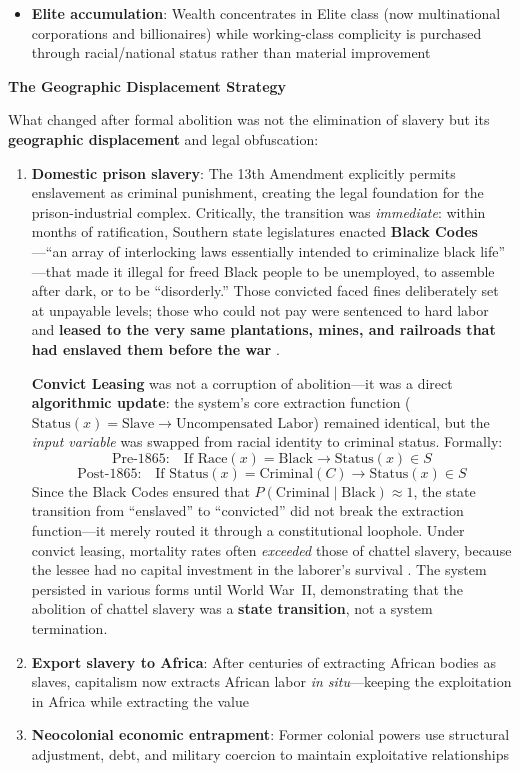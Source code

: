 \documentclass[12pt,openany]{book}
\begin{document}
\begin{itemize}
    \item \textbf{Elite accumulation}: Wealth concentrates in Elite class (now multi\-national corporations and billionaires) while working-class complicity is purchased through racial/national status rather than material improvement
\end{itemize}

\textbf{The Geographic Displacement Strategy}

What changed after formal abolition was not the elimination of slavery but its \textbf{geographic displacement} and legal obfuscation:

\begin{enumerate}
    \item \textbf{Domestic prison slavery}: The 13th Amendment explicitly permits enslavement as criminal punishment, creating the legal foundation for the prison-industrial complex. Critically, the transition was \textit{immediate}: within months of ratification, Southern state legislatures enacted \textbf{Black Codes}---``an array of interlocking laws essentially intended to criminalize black life'' \cite{blackmon}---that made it illegal for freed Black people to be unemployed, to assemble after dark, or to be ``disorderly.'' Those convicted faced fines deliberately set at unpayable levels; those who could not pay were sentenced to hard labor and \textbf{leased to the very same plantations, mines, and railroads that had enslaved them before the war} \cite{blackmon, lichtenstein}.

    \textbf{Convict Leasing} was not a corruption of abolition---it was a direct \textbf{algorithmic update}: the system's core extraction function ($\text{Status}(x) = \text{Slave} \rightarrow \text{Uncompensated Labor}$) remained identical, but the \textit{input variable} was swapped from racial identity to criminal status. Formally:
    \[
    \text{Pre-1865:} \quad \text{If } \text{Race}(x) = \text{Black} \rightarrow \text{Status}(x) \in S
    \]
    \[
    \text{Post-1865:} \quad \text{If } \text{Status}(x) = \text{Criminal}(C) \rightarrow \text{Status}(x) \in S
    \]
    Since the Black Codes ensured that $P(\text{Criminal} \mid \text{Black}) \approx 1$, the state transition from ``enslaved'' to ``convicted'' did not break the extraction function---it merely routed it through a constitutional loophole. Under convict leasing, mortality rates often \textit{exceeded} those of chattel slavery, because the lessee had no capital investment in the laborer's survival \cite{blackmon, lichtenstein}. The system persisted in various forms until World War~II, demonstrating that the abolition of chattel slavery was a \textbf{state transition}, not a system termination.

    \item \textbf{Export slavery to Africa}: After centuries of extracting African bodies as slaves, capitalism now extracts African labor \textit{in situ}---keeping the exploitation in Africa while extracting the value
    \item \textbf{Neocolonial economic entrapment}: Former colonial powers use structural adjustment, debt, and military coercion to maintain exploitative relationships
\end{enumerate}
\end{document}
